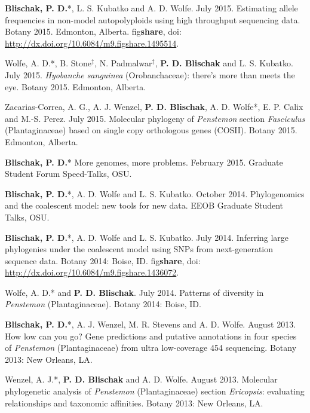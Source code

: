 \documentclass[]{article}
\begin{document}
\begin{etaremune}
\item
  \textbf{Blischak, P. D.}*, L. S. Kubatko and A. D. Wolfe. July 2015.
  Estimating allele frequencies in non-model autopolyploids using high
  throughput sequencing data. Botany 2015. Edmonton, Alberta.
  fig\textbf{share}, doi:
  \href{http://dx.doi.org/10.6084/m9.figshare.1495514}{\url{http://dx.doi.org/10.6084/m9.figshare.1495514}}.
\item
  Wolfe, A. D.*, B. Stone\(^{\ddagger}\), N. Padmalwar\(^{\ddagger}\),
  \textbf{P. D. Blischak} and L. S. Kubatko. July 2015. \emph{Hyobanche
  sanguinea} (Orobanchaceae): there's more than meets the eye. Botany
  2015. Edmonton, Alberta.
\item
  Zacarias-Correa, A. G., A. J. Wenzel, \textbf{P. D. Blischak}, A. D.
  Wolfe*, E. P. Calix and M.-S. Perez. July 2015. Molecular phylogeny of
  \emph{Penstemon} section \emph{Fasciculus} (Plantaginaceae) based on
  single copy orthologous genes (COSII). Botany 2015. Edmonton, Alberta.
\item
  \textbf{Blischak, P. D.}* More genomes, more problems. February 2015.
  Graduate Student Forum Speed-Talks, OSU.
\item
  \textbf{Blischak, P. D.}*, A. D. Wolfe and L. S. Kubatko. October
  2014. Phylogenomics and the coalescent model: new tools for new data.
  EEOB Graduate Student Talks, OSU.
\item
  \textbf{Blischak, P. D.}*, A. D. Wolfe and L. S. Kubatko. July 2014.
  Inferring large phylogenies under the coalescent model using SNPs from
  next-generation sequence data. Botany 2014: Boise, ID.
  fig\textbf{share}, doi:
  \href{http://dx.doi.org/10.6084/m9.figshare.1436072}{\url{http://dx.doi.org/10.6084/m9.figshare.1436072}}.
\item
  Wolfe, A. D.* and \textbf{P. D. Blischak}. July 2014. Patterns of
  diversity in \emph{Penstemon} (Plantaginaceae). Botany 2014: Boise,
  ID.
\item
  \textbf{Blischak, P. D.}*, A. J. Wenzel, M. R. Stevens and A. D.
  Wolfe. August 2013. How low can you go? Gene predictions and putative
  annotations in four species of \emph{Penstemon} (Plantaginaceae) from
  ultra low-coverage 454 sequencing. Botany 2013: New Orleans, LA.
\item
  Wenzel, A. J.*, \textbf{P. D. Blischak} and A. D. Wolfe. August 2013.
  Molecular phylogenetic analysis of \emph{Penstemon} (Plantaginaceae)
  section \emph{Ericopsis}: evaluating relationships and taxonomic
  affinities. Botany 2013: New Orleans, LA.
\end{etaremune}
\end{document}
